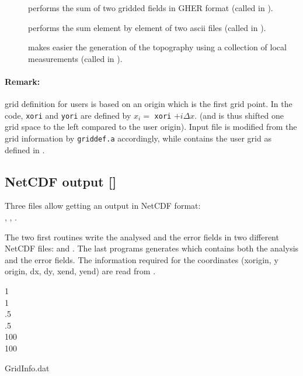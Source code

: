 \begin{description}
\item[] performs the sum of two gridded fields in GHER format (called in ).

\item[] performs the sum element by element of two ascii files (called in ).

\item[] makes easier the generation of the topography using a collection of local measurements (called in ).

\end{description}

\paragraph{Remark:} grid definition for users is based on an origin which is the first grid point. 
In the code, \texttt{xori} and \texttt{yori} are defined by $x_i=$ \texttt{xori} $+i \Delta x$.
(and is thus shifted one grid space to the left compared to the user origin). Input file  is modified from the  grid information by \texttt{griddef.a} accordingly, while  contains the user grid as defined in .


\subsection[NetCDF output]{NetCDF output []}

Three files allow getting an output in NetCDF format:\\ 
, , . 

The two first routines write the analysed and the error fields in two different NetCDF files:  and . The last programs generates  which contains both the analysis and the error fields. The information required for the coordinates (xorigin, y origin, dx, dy, xend, yend) are read from .

\begin{exfile}[H]
1\\
1\\
.5\\
 .5\\
100\\
100
\caption{GridInfo.dat}
\end{exfile}


